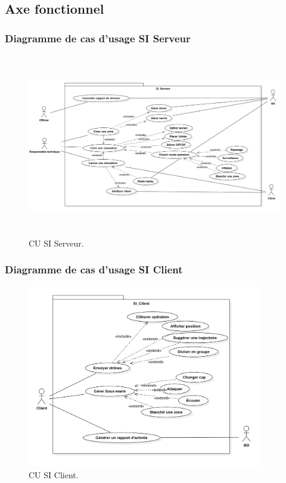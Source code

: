 	\subsection{Axe fonctionnel}



\subsubsection{Diagramme de cas d'usage SI Serveur}
\begin{figure}[H]
	\centering
	\includegraphics[height=8cm]{img/CUSI_Serveur.png} 
	\caption{CU SI Serveur.}
\end{figure}
\subsubsection{Diagramme de cas d'usage SI Client}
\begin{figure}[H]
	\centering
	\includegraphics[height=8cm]{img/CUSI_Client.png} 
	\caption{CU SI Client.}
\end{figure}


